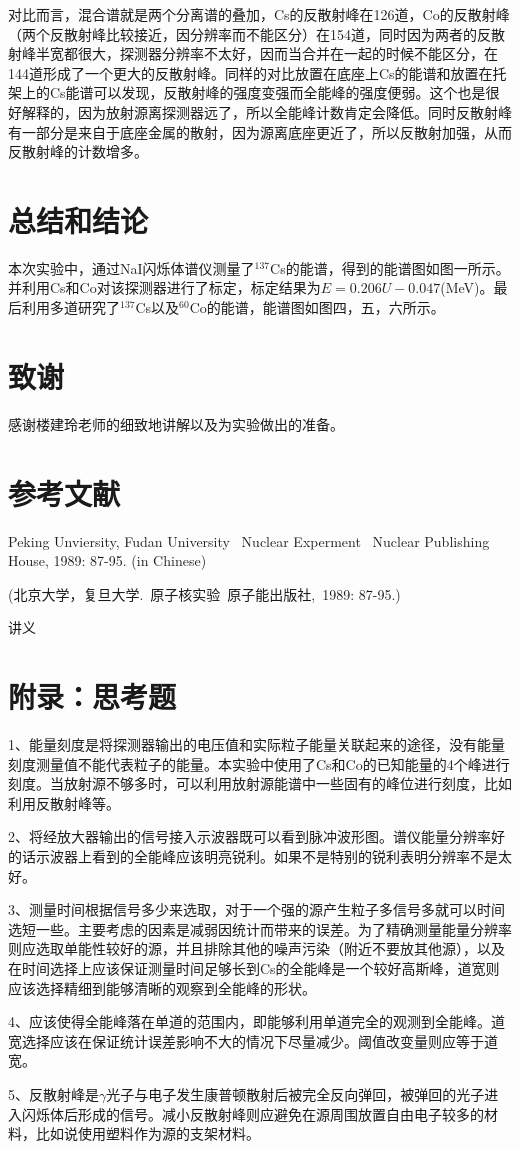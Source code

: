 \documentclass[a4paper,10.0pt,twoside]{npr}
\begin{document}
\begin{multicols}{2}
对比而言，混合谱就是两个分离谱的叠加，Cs的反散射峰在126道，Co的反散射峰（两个反散射峰比较接近，因分辨率而不能区分）在154道，同时因为两者的反散射峰半宽都很大，探测器分辨率不太好，因而当合并在一起的时候不能区分，在144道形成了一个更大的反散射峰。同样的对比放置在底座上Cs的能谱和放置在托架上的Cs能谱可以发现，反散射峰的强度变强而全能峰的强度便弱。这个也是很好解释的，因为放射源离探测器远了，所以全能峰计数肯定会降低。同时反散射峰有一部分是来自于底座金属的散射，因为源离底座更近了，所以反散射加强，从而反散射峰的计数增多。

\section{总结和结论}
本次实验中，通过NaI闪烁体谱仪测量了$^{137}$Cs的能谱，得到的能谱图如图一所示。并利用Cs和Co对该探测器进行了标定，标定结果为$  E = 0.206 U - 0.047 $(MeV)。最后利用多道研究了$^{137}$Cs以及$^{60}$Co的能谱，能谱图如图四，五，六所示。
\section{致谢}
感谢楼建玲老师的细致地讲解以及为实验做出的准备。
\section{参考文献}

\noindent
[1] Peking Unviersity, Fudan University \ Nuclear Experment
\ Nuclear Publishing House, 1989: 87-95. (in Chinese)

\noindent
 (北京大学，复旦大学.\ 原子核实验\ 原子能出版社,\ 1989: 87-95.)

\noindent
[2] 讲义
\end{multicols}

\newpage


\section*{附录：思考题}
1、能量刻度是将探测器输出的电压值和实际粒子能量关联起来的途径，没有能量刻度测量值不能代表粒子的能量。本实验中使用了Cs和Co的已知能量的4个峰进行刻度。当放射源不够多时，可以利用放射源能谱中一些固有的峰位进行刻度，比如利用反散射峰等。

2、将经放大器输出的信号接入示波器既可以看到脉冲波形图。谱仪能量分辨率好的话示波器上看到的全能峰应该明亮锐利。如果不是特别的锐利表明分辨率不是太好。

3、测量时间根据信号多少来选取，对于一个强的源产生粒子多信号多就可以时间选短一些。主要考虑的因素是减弱因统计而带来的误差。为了精确测量能量分辨率则应选取单能性较好的源，并且排除其他的噪声污染（附近不要放其他源），以及在时间选择上应该保证测量时间足够长到Cs的全能峰是一个较好高斯峰，道宽则应该选择精细到能够清晰的观察到全能峰的形状。

4、应该使得全能峰落在单道的范围内，即能够利用单道完全的观测到全能峰。道宽选择应该在保证统计误差影响不大的情况下尽量减少。阈值改变量则应等于道宽。

5、反散射峰是$\gamma$光子与电子发生康普顿散射后被完全反向弹回，被弹回的光子进入闪烁体后形成的信号。减小反散射峰则应避免在源周围放置自由电子较多的材料，比如说使用塑料作为源的支架材料。

\clearpage
\end{document}

